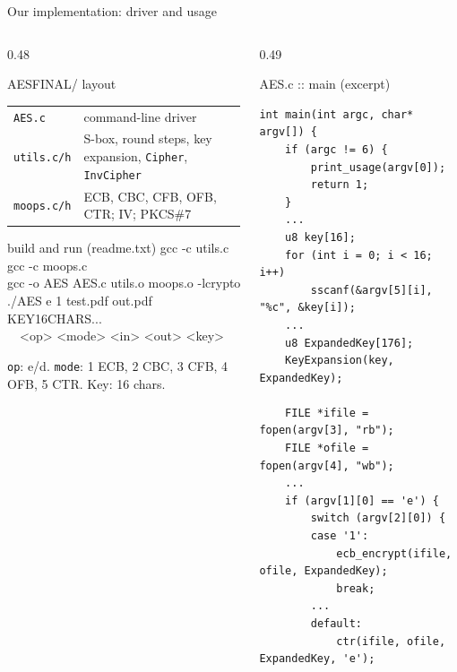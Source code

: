 \documentclass[aspectratio=169,10pt]{beamer}
\newcommand{\codesmall}{\lstset{basicstyle=\ttfamily\fontsize{5.5}{6.4}\selectfont}}
\newcommand{\codenormal}{\lstset{basicstyle=\ttfamily\fontsize{5.9}{6.9}\selectfont}}
\begin{document}
\begin{frame}[fragile]{Our implementation: driver and usage}
\begin{columns}[T]
\begin{column}{0.48\textwidth}
\begin{tbox}{AESFINAL/ layout}
\footnotesize
\begin{tabular}{@{}l@{\ }p{3.6cm}@{}}
\texttt{AES.c} & command-line driver \\
\texttt{utils.c/h} & S-box, round steps, key expansion, \texttt{Cipher}, \texttt{InvCipher} \\
\texttt{moops.c/h} & ECB, CBC, CFB, OFB, CTR; IV; PKCS\#7 \\
\end{tabular}
\end{tbox}
\vskip4pt
\begin{tbox}{build and run (readme.txt)}
\footnotesize\ttfamily
gcc -c utils.c\\
gcc -c moops.c\\
gcc -o AES AES.c utils.o moops.o -lcrypto\\[3pt]
./AES e 1 test.pdf out.pdf KEY16CHARS...\\
\ \ <op> <mode> <in> <out> <key>
\end{tbox}
\vskip2pt
{\scriptsize \texttt{op}: e/d. \texttt{mode}: 1 ECB, 2 CBC, 3 CFB, 4 OFB, 5 CTR. Key: 16 chars.}
\end{column}
\begin{column}{0.49\textwidth}
\codesmall
\begin{tbox}{AES.c :: main (excerpt)}
\begin{lstlisting}
int main(int argc, char* argv[]) {
    if (argc != 6) {
        print_usage(argv[0]);
        return 1;
    }
    ...
    u8 key[16];
    for (int i = 0; i < 16; i++)
        sscanf(&argv[5][i], "%c", &key[i]);
    ...
    u8 ExpandedKey[176];
    KeyExpansion(key, ExpandedKey);

    FILE *ifile = fopen(argv[3], "rb");
    FILE *ofile = fopen(argv[4], "wb");
    ...
    if (argv[1][0] == 'e') {
        switch (argv[2][0]) {
        case '1':
            ecb_encrypt(ifile, ofile, ExpandedKey);
            break;
        ...
        default:
            ctr(ifile, ofile, ExpandedKey, 'e');
\end{lstlisting}
\end{tbox}
\codenormal
\end{column}
\end{columns}
\end{frame}
\end{document}
